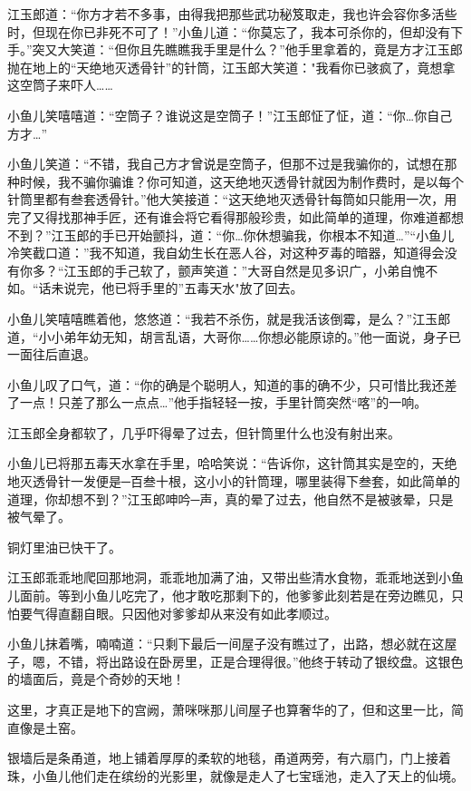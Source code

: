 \documentclass[12pt,oneside]{book}
\begin{document}
江玉郎道：``你方才若不多事，由得我把那些武功秘笈取走，我也许会容你多活些时，但现在你已非死不可了！''小鱼儿道：``你莫忘了，我本可杀你的，但却没有下手。''突又大笑道：``但你且先瞧瞧我手里是什么？''他手里拿着的，竟是方才江玉郎抛在地上的``天绝地灭透骨针''的针筒，江玉郎大笑道："我看你已骇疯了，竟想拿这空筒子来吓人\ldots\ldots{}

小鱼儿笑嘻嘻道：``空筒子？谁说这是空筒子！''江玉郎怔了怔，道：``你\ldots 你自己方才\ldots{}''

小鱼儿笑道：``不错，我自己方才曾说是空筒子，但那不过是我骗你的，试想在那种时候，我不骗你骗谁？你可知道，这天绝地灭透骨针就因为制作费时，是以每个针筒里都有叁套透骨针。''他大笑接道：``这天绝地灭透骨针每筒如只能用一次，用完了又得找那神手匠，还有谁会将它看得那般珍贵，如此简单的道理，你难道都想不到？''江玉郎的手已开始颤抖，道：``你\ldots 你休想骗我，你根本不知道\ldots{}''``小鱼儿冷笑截口道：''我不知道，我自幼生长在恶人谷，对这种歹毒的暗器，知道得会没有你多？``江玉郎的手己软了，颤声笑道：''大哥自然是见多识广，小弟自愧不如。``话未说完，他已将手里的''五毒天水"放了回去。

小鱼儿笑嘻嘻瞧着他，悠悠道：``我若不杀伤，就是我活该倒霉，是么？''江玉郎道，``小小弟年幼无知，胡言乱语，大哥你\ldots\ldots 你想必能原谅的。''他一面说，身子已一面往后直退。

小鱼儿叹了口气，道：``你的确是个聪明人，知道的事的确不少，只可惜比我还差了一点！只差了那么一点点\ldots{}''他手指轻轻一按，手里针筒突然``喀''的一响。

江玉郎全身都软了，几乎吓得晕了过去，但针筒里什么也没有射出来。

小鱼儿已将那五毒天水拿在手里，哈哈笑说：``告诉你，这针筒其实是空的，天绝地灭透骨针一发便是─百叁十根，这小小的针筒理，哪里装得下叁套，如此简单的道理，你却想不到？''江玉郎呻吟─声，真的晕了过去，他自然不是被骇晕，只是被气晕了。

铜灯里油已快干了。

江玉郎乖乖地爬回那地洞，乖乖地加满了油，又带出些清水食物，乖乖地送到小鱼儿面前。等到小鱼儿吃完了，他才敢吃那剩下的，他爹爹此刻若是在旁边瞧见，只怕要气得直翻自眼。只因他对爹爹却从来没有如此孝顺过。

小鱼儿抹着嘴，喃喃道：``只剩下最后一间屋子没有瞧过了，出路，想必就在这屋子，嗯，不错，将出路设在卧房里，正是合理得很。''他终于转动了银绞盘。这银色的墙面后，竟是个奇妙的天地！

这里，才真正是地下的宫阙，萧咪咪那儿间屋子也算奢华的了，但和这里一比，简直像是土窑。

银墙后是条甬道，地上铺着厚厚的柔软的地毯，甬道两旁，有六扇门，门上接着珠，小鱼儿他们走在缤纷的光影里，就像是走人了七宝瑶池，走入了天上的仙境。
\end{document}
